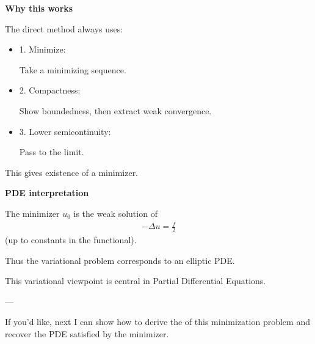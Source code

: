\begin{description}
\item \textbf{Why this works}

The direct method always uses:

		\begin{itemize}
        \item 1. Minimize:

Take a minimizing sequence.

        \item 2. Compactness:

Show boundedness, then extract weak convergence.

        \item 3. Lower semicontinuity:

Pass to the limit.

		\end{itemize}

This gives existence of a minimizer.

\item \textbf{PDE interpretation}

The minimizer $u_0$ is the weak solution of
\begin{align*}
-\Delta u=\frac{f}{2}
\end{align*}
(up to constants in the functional).

Thus the variational problem corresponds to an elliptic PDE.

This variational viewpoint is central in Partial Differential Equations.

---
\end{description}

If you'd like, next I can show how to derive the  of this minimization problem and recover the PDE satisfied by the minimizer.

